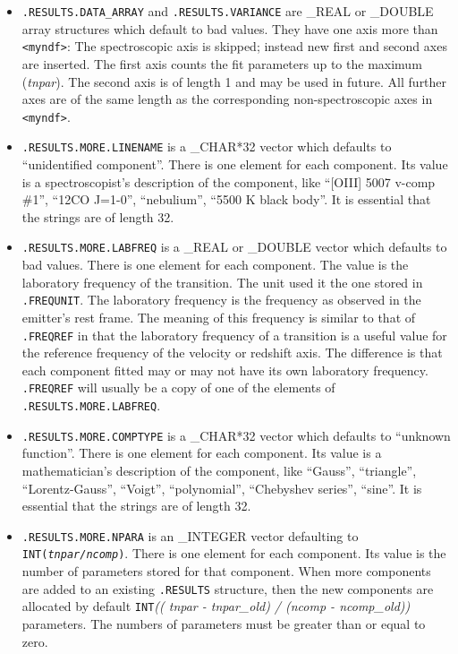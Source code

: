 \begin{itemize}

\item{\tt .RESULTS.DATA\_ARRAY} and {\tt .RESULTS.VARIANCE} are \_REAL
   or \_DOUBLE array structures which default to bad values. They have
   one axis more than {\tt <myndf>}: The spectroscopic axis is skipped;
   instead new first and second axes are inserted. The first axis counts
   the fit parameters up to the maximum ({\it tnpar}). The second axis
   is of length 1 and may be used in future. All further axes are of the
   same length as the corresponding non-spectroscopic axes in {\tt
   <myndf>}.

\item{\tt .RESULTS.MORE.LINENAME} is a \_CHAR*32 vector which defaults
   to ``unidentified component''. There is one element for each
   component. Its value is a spectroscopist's description of the
   component, like ``[OIII] 5007 v-comp \#1'', ``12CO J=1-0'',
   ``nebulium'', ``5500 K black body''. It is essential that the strings
   are of length 32.

\item{\tt .RESULTS.MORE.LABFREQ} is a \_REAL or \_DOUBLE vector which
   defaults to bad values. There is one element for each component. The
   value is the laboratory frequency of the transition. The unit used it
   the one stored in {\tt .FREQUNIT}. The laboratory frequency is the
   frequency as observed in the emitter's rest frame. The meaning of
   this frequency is similar to that of {\tt .FREQREF} in that the
   laboratory frequency of a transition is a useful value for the
   reference frequency of the velocity or redshift axis. The difference
   is that each component fitted may or may not have its own laboratory
   frequency. {\tt .FREQREF} will usually be a copy of one of the
   elements of {\tt .RESULTS.MORE.LABFREQ}.

\item{\tt .RESULTS.MORE.COMPTYPE} is a \_CHAR*32 vector which defaults
   to ``unknown function''. There is one element for each component. Its
   value is a mathematician's description of the component, like
   ``Gauss'', ``triangle'', ``Lorentz-Gauss'', ``Voigt'',
   ``polynomial'', ``Chebyshev series'', ``sine''. It is essential that
   the strings are of length 32.

\item{\tt .RESULTS.MORE.NPARA} is an \_INTEGER vector defaulting to {\tt
   INT({\it tnpar/ncomp})}. There is one element for each component. Its
   value is the number of parameters stored for that component. When
   more components are added to an existing {\tt .RESULTS} structure,
   then the new components are allocated by default {\tt INT}{\it(( tnpar
   - tnpar\_old) / (ncomp - ncomp\_old))} parameters. The numbers of
   parameters must be greater than or equal to zero.


\end{itemize}
